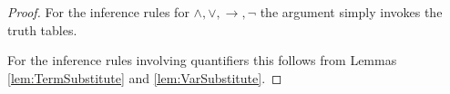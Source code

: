 

\setcounter{section}{2}
\setcounter{subsection}{2}
\setcounter{dfn}{5}

\begin{proof}
For the inference rules for $\wedge, \vee, \to, \neg$ the argument simply invokes the truth tables.

For the inference rules involving quantifiers this follows from Lemmas \ref{lem:TermSubstitute} and \ref{lem:VarSubstitute}.
\end{proof}


